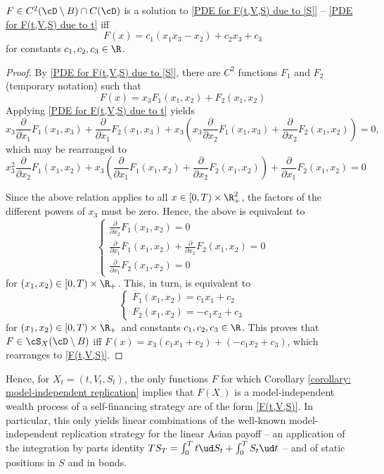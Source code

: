\documentclass[11pt]{article}
\begin{document}
\begin{proposition}
\label{proposition: solutions for F(t,V,S)}
$F \in C^2(\cD \setminus B) \cap C(\cD)$ is a solution to \eqref{PDE  for F(t,V,S) due to [S]} -- \eqref{PDE for F(t,V,S) due to t} iff
\begin{equation}
\label{F(t,V,S)}
F(x) = c_1 (x_1 x_3 - x_2)  + c_2 x_3 + c_3
\end{equation}
for constants $c_1, c_2, c_3 \in \R$. 
\end{proposition}

\begin{proof}

By \eqref{PDE for F(t,V,S) due to [S]}, there are $C^2$ functions $F_1$ and $F_2$ (temporary notation) such that
$$
F(x) = x_3 F_1(x_1, x_2) + F_2(x_1, x_2)
$$
Applying \eqref{PDE for F(t,V,S) due to t} yields
$$
x_3 \frac{\partial}{\partial x_1} F_1(x_1, x_3) + \frac{\partial}{\partial x_1} F_2(x_1, x_3) + x_3 \left( x_3 \frac{\partial}{\partial x_2} F_1(x_1, x_3) + \frac{\partial}{\partial x_2} F_2(x_1, x_2) \right) = 0,
$$
which may be rearranged to
$$
x_3^2 \frac{\partial}{\partial x_2} F_1(x_1, x_2) + x_3 \left( \frac{\partial}{\partial x_1} F_1(x_1, x_2) + \frac{\partial}{\partial x_2} F_2(x_1, x_2) \right) + \frac{\partial}{\partial x_1} F_2(x_1, x_2) = 0
$$

Since the above relation applies to all $x \in [0,T) \times \R_+^2$, the factors of the different powers of $x_3$ must be zero. Hence, the above is equivalent to 
\[
\begin{cases}
\frac{\partial}{\partial x_2} F_1(x_1, x_2) = 0 \\
\frac{\partial}{\partial x_1} F_1(x_1, x_2) + \frac{\partial}{\partial x_2} F_2(x_1, x_2) = 0 \\
\frac{\partial}{\partial x_1} F_2(x_1, x_2) = 0
\end{cases}
\]
for $(x_1, x_2) \in [0,T) \times \R_+$. This, in turn, is equivalent to
\[
\begin{cases}
F_1(x_1, x_2) = c_1 x_1 + c_2 \\
F_2(x_1, x_2) = -c_1 x_2 + c_3
\end{cases}
\]
for $(x_1, x_2) \in [0,T) \times \R_+$ and constants $c_1, c_2, c_3 \in \R$. This proves that $F \in \cS_X(\cD \setminus B)$ iff $F(x) = x_3 (c_1 x_1 + c_2) + (-c_1 x_2 + c_3)$, which rearranges to \eqref{F(t,V,S)}.

\end{proof}

Hence, for $X_t = (t, V_t, S_t)$, the only functions $F$ for which Corollary \ref{corollary: model-independent replication} implies that $F(X_\cdot)$ is a model-independent wealth process of a self-financing strategy are of the form \eqref{F(t,V,S)}. In particular, this only yields linear combinations of the well-known model-independent replication strategy for the linear Asian payoff -- an application of the integration by parts identity $T S_T = \int_0^T t \ud S_t + \int_0^T S_t \ud t$ -- and of static positions in $S$ and in bonds. 
\end{document}
